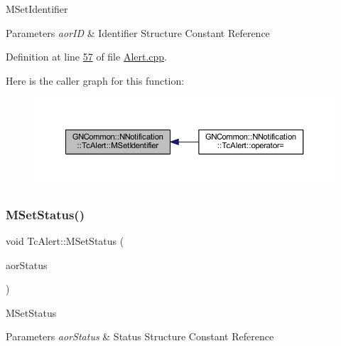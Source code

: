 M\+Set\+Identifier 
\begin{DoxyParams}{Parameters}
{\em aor\+ID} & Identifier Structure Constant Reference \\
\hline
\end{DoxyParams}


Definition at line \mbox{\hyperlink{_alert_8cpp_source_l00057}{57}} of file \mbox{\hyperlink{_alert_8cpp_source}{Alert.\+cpp}}.

Here is the caller graph for this function\+:
\nopagebreak
\begin{figure}[H]
\begin{center}
\leavevmode
\includegraphics[width=350pt]{class_g_n_common_1_1_n_notification_1_1_tc_alert_a5411a5d9659282e199ceb16a1b88c17d_icgraph}
\end{center}
\end{figure}
\mbox{\label{class_g_n_common_1_1_n_notification_1_1_tc_alert_a682a17a50fc2c50bfb92ec3eeafdb5c9}} 
\subsubsection{\texorpdfstring{M\+Set\+Status()}{MSetStatus()}}
{\footnotesize\ttfamily void Tc\+Alert\+::\+M\+Set\+Status (\begin{DoxyParamCaption}\item[{const \mbox{\hyperlink{class_g_n_common_1_1_n_notification_1_1_tc_status}{Tc\+Status}} \&}]{aor\+Status }\end{DoxyParamCaption})}

M\+Set\+Status 
\begin{DoxyParams}{Parameters}
{\em aor\+Status} & Status Structure Constant Reference \\
\hline
\end{DoxyParams}


